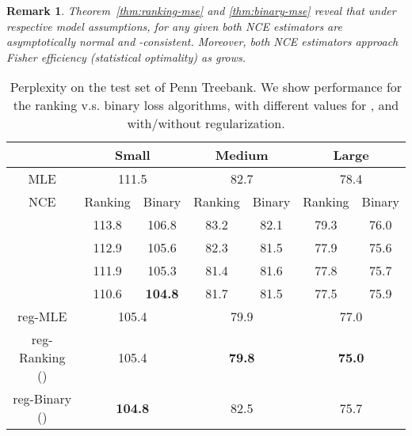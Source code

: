 \documentclass[11pt,a4paper]{article}
\newtheorem{remark}{Remark}[section]
\begin{document}
\begin{remark}
  Theorem~\ref{thm:ranking-mse} and \ref{thm:binary-mse} reveal that under respective model assumptions, for any given  both NCE estimators are asymptotically normal and -consistent. Moreover, both NCE estimators approach Fisher efficiency (statistical optimality) as  grows. 
\end{remark}














\begin{table*}[t!]
\centering
\begin{small}
\begin{tabular}{|c|c|c|c|c|c|c|}
\hline
&   \multicolumn{2}{|c|}{Small}  &  \multicolumn{2}{|c|}{Medium}  &  \multicolumn{2}{|c|}{Large} \\
\hline
MLE  &  \multicolumn{2}{|c|}{111.5} & \multicolumn{2}{|c|}{82.7}   & \multicolumn{2}{|c|}{78.4}\\
\hline
 NCE   &Ranking &Binary         &Ranking &Binary   &Ranking &Binary   \\
 \hline
   & 113.8 & 106.8     & 83.2  & 82.1        & 79.3        &76.0   \\
\hline
   & 112.9 & 105.6     & 82.3  & 81.5        & 77.9      &75.6   \\
\hline
   & 111.9 & 105.3     & 81.4  & 81.6        & 77.8       &75.7   \\
\hline
  & 110.6 & \textbf{104.8} & 81.7  & 81.5   & 77.5  &75.9   \\
\hline
reg-MLE      & \multicolumn{2}{|c|}{105.4}   &\multicolumn{2}{|c|}{79.9}     & \multicolumn{2}{|c|}{77.0} \\
\hline
reg-Ranking ()  & \multicolumn{2}{|c|}{105.4}   &\multicolumn{2}{|c|}{\textbf{79.8}}     & \multicolumn{2}{|c|}{\textbf{75.0}} \\
\hline
reg-Binary ()  & \multicolumn{2}{|c|}{\textbf{104.8}}  &\multicolumn{2}{|c|}{82.5}     & \multicolumn{2}{|c|}{75.7} \\
\hline
\end{tabular}
\end{small}
\caption{Perplexity on the test set of Penn Treebank. We show performance for
the ranking v.s. binary loss algorithms, with different values for ,
and with/without regularization.}
\label{table:lm-test}
\end{table*}
\end{document}
